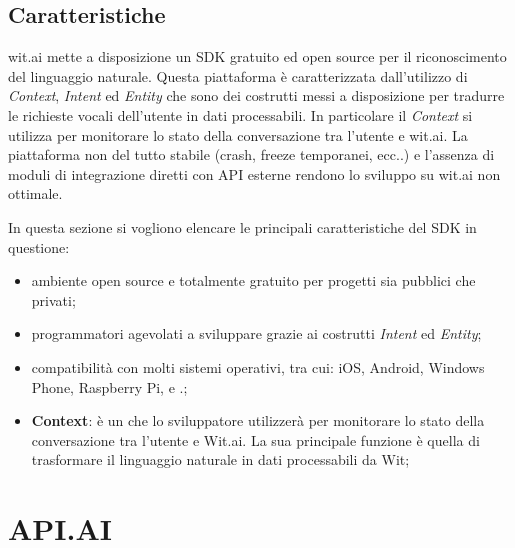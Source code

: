 \documentclass[a4paper,titlepage]{article}
\begin{document}
		\subsection{Caratteristiche}

			wit.ai mette a disposizione un SDK gratuito ed open source per il riconoscimento del linguaggio naturale. Questa piattaforma è caratterizzata dall'utilizzo di \textit{Context}, \textit{Intent} ed \textit{Entity} che sono dei costrutti messi a disposizione per tradurre le richieste vocali dell'utente in dati processabili. In particolare il \textit{Context} si utilizza per monitorare lo stato della conversazione tra l'utente e wit.ai.
			La piattaforma non del tutto stabile (crash, freeze temporanei, ecc..) e l'assenza di moduli di integrazione diretti con API esterne rendono lo sviluppo su wit.ai non ottimale.

In questa sezione si vogliono elencare le principali caratteristiche del SDK in questione:
\begin{itemize}
	\item ambiente open source e totalmente gratuito per progetti sia pubblici che privati;
	\item programmatori agevolati a sviluppare grazie ai costrutti \textit{Intent} ed \textit{Entity}; 
	\item compatibilità con molti sistemi operativi, tra cui: iOS, Android, Windows Phone, Raspberry Pi,  e .;
	\item \textbf{Context}: è un  che lo sviluppatore utilizzerà per monitorare lo stato della conversazione tra l'utente e Wit.ai. La sua principale funzione è quella di trasformare il linguaggio naturale in dati processabili da Wit;	
\end{itemize}
		
\newpage
\section{API.AI}
\end{document}
